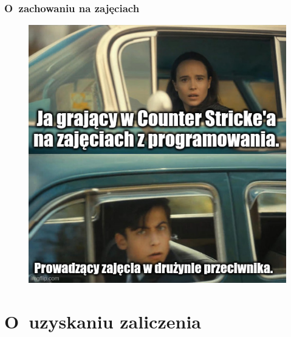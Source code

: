 \documentclass[10pt,t]{beamer}
\begin{document}
\begin{frame}
  \frametitle{O~zachowaniu na zajęciach}


  \begin{figure}

    \label{fig:aaa}

    \centering


    \includegraphics[scale=0.41]
    {./Presentations-pictures/Jak-to-bywa-na-zajeciach.jpeg}

  \end{figure}






\end{frame}










\section{O~uzyskaniu zaliczenia}
\end{document}
